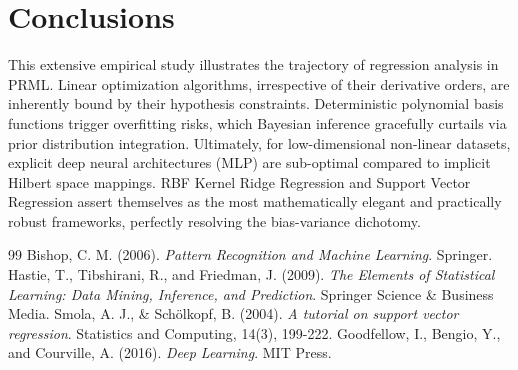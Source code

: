 \documentclass[12pt,a4paper]{article}
\begin{document}
\section{Conclusions}
This extensive empirical study illustrates the trajectory of regression analysis in PRML. Linear optimization algorithms, irrespective of their derivative orders, are inherently bound by their hypothesis constraints. Deterministic polynomial basis functions trigger overfitting risks, which Bayesian inference gracefully curtails via prior distribution integration. Ultimately, for low-dimensional non-linear datasets, explicit deep neural architectures (MLP) are sub-optimal compared to implicit Hilbert space mappings. RBF Kernel Ridge Regression and Support Vector Regression assert themselves as the most mathematically elegant and practically robust frameworks, perfectly resolving the bias-variance dichotomy.

\newpage
\begin{thebibliography}{99}
     Bishop, C. M. (2006). \textit{Pattern Recognition and Machine Learning}. Springer.
     Hastie, T., Tibshirani, R., and Friedman, J. (2009). \textit{The Elements of Statistical Learning: Data Mining, Inference, and Prediction}. Springer Science \& Business Media.
     Smola, A. J., \& Schölkopf, B. (2004). \textit{A tutorial on support vector regression}. Statistics and Computing, 14(3), 199-222.
     Goodfellow, I., Bengio, Y., and Courville, A. (2016). \textit{Deep Learning}. MIT Press.
\end{thebibliography}
\end{document}
